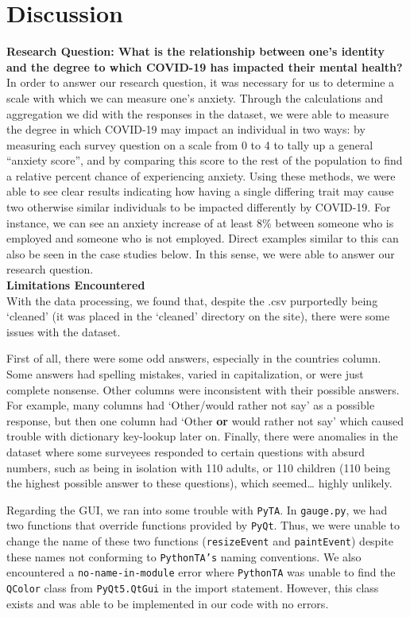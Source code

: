 \documentclass[fontsize=11pt]{article}
\begin{document}
    \section*{Discussion}
    \textbf{Research Question: What is the relationship between one’s identity and the degree to which COVID-19 has impacted their mental health?} \\
    In order to answer our research question, it was necessary for us to determine a scale with which we can measure one’s anxiety. Through the calculations and aggregation we did with the responses in the dataset, we were able to measure the degree in which COVID-19 may impact an individual in two ways: by measuring each survey question on a scale from 0 to 4 to tally up a general “anxiety score”, and by comparing this score to the rest of the population to find a relative percent chance of experiencing anxiety. Using these methods, we were able to see clear results indicating how having a single differing trait may cause two otherwise similar individuals to be impacted differently by COVID-19. For instance, we can see an anxiety increase of at least 8\% between someone who is employed and someone who is not employed. Direct examples similar to this can also be seen in the case studies below. In this sense, we were able to answer our research question. \\

    \textbf{Limitations Encountered} \\
    With the data processing, we found that, despite the .csv purportedly being ‘cleaned’ (it was placed in the ‘cleaned’ directory on the site), there were some issues with the dataset.

    First of all, there were some odd answers, especially in the countries column. Some answers had spelling mistakes, varied in capitalization, or were just complete nonsense. Other columns were inconsistent with their possible answers. For example, many columns had ‘Other/would rather not say’ as a possible response, but then one column had ‘Other \textbf{or} would rather not say’ which caused trouble with dictionary key-lookup later on. Finally, there were anomalies in the dataset where some surveyees responded to certain questions with absurd numbers, such as being in isolation with 110 adults, or 110 children (110 being the highest possible answer to these questions), which seemed… highly unlikely.

	Regarding the GUI, we ran into some trouble with \texttt{PyTA}. In \texttt{gauge.py}, we had two functions that override functions provided by \texttt{PyQt}. Thus, we were unable to change the name of these two functions (\texttt{resizeEvent} and \texttt{paintEvent}) despite these names not conforming to \texttt{PythonTA’s} naming conventions. We also encountered a \texttt{no-name-in-module} error where \texttt{PythonTA} was unable to find the \texttt{QColor} class from \texttt{PyQt5.QtGui} in the import statement. However, this class exists and was able to be implemented in our code with no errors. \\
\end{document}
